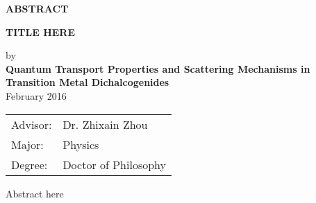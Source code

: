 \begin{center}
\textbf{ABSTRACT}
	
	
	\singlespacing
\textbf{TITLE HERE}\\
	\doublespacing
	
	by\\
	
	\textbf{Quantum Transport Properties and Scattering Mechanisms in Transition Metal Dichalcogenides}\\
	February 2016\\
\end{center}
\begin{tabular}{ll}	
Advisor: & Dr. Zhixain Zhou\\
Major:   &Physics\\
Degree:  &Doctor of Philosophy
\end{tabular}
\bigskip

Abstract here
